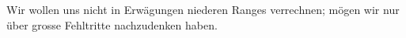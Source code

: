 Wir wollen uns nicht in Erwägungen niederen Ranges verrechnen; mögen wir nur über grosse Fehltritte nachzudenken haben.
\par

